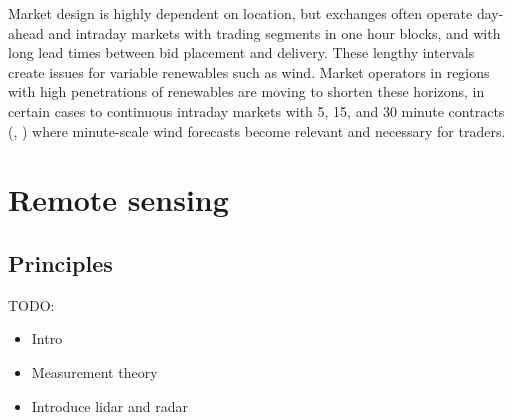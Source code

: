Market design is highly dependent on location, but exchanges often operate day-ahead and intraday markets with trading segments in one hour blocks, and with long lead times between bid placement and delivery. These lengthy intervals create issues for variable renewables such as wind. Market operators in regions with high penetrations of renewables are moving to shorten these horizons, in certain cases to continuous intraday markets with 5, 15, and 30 minute contracts (\cite{epex_spot_se_continuous_2019}, \cite{aemc_five_2017}) where minute-scale wind forecasts become relevant and necessary for traders.

\clearpage
\section{Remote sensing}
\label{intro_remote_sensing}

\subsection{Principles}
\label{sec:intro_rs_principles}

TODO:
\begin{itemize}
\color{red}
    \item Intro
    \item Measurement theory
    \item Introduce lidar and radar
\end{itemize}


